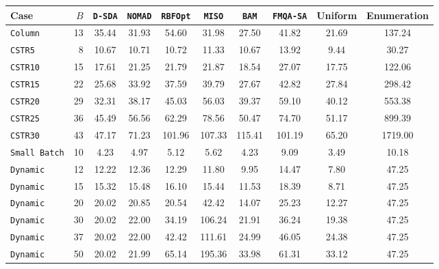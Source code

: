 \begin{tabular}{@{}lrcccccccc@{}}\toprule
Case & \(B\) & \texttt{D-SDA} & \texttt{NOMAD} & \texttt{RBFOpt} & \texttt{MISO} & \texttt{BAM} & \texttt{FMQA-SA} & Uniform & Enumeration \\\midrule
\texttt{Column} & 13 & 35.44 & 31.93 & 54.60 & 31.98 & 27.50 & 41.82 & 21.69 & 137.24 \\
\texttt{CSTR5} & 8 & 10.67 & 10.71 & 10.72 & 11.33 & 10.67 & 13.92 & 9.44 & 30.27 \\
\texttt{CSTR10} & 15 & 17.61 & 21.25 & 21.79 & 21.87 & 18.54 & 27.07 & 17.75 & 122.06 \\
\texttt{CSTR15} & 22 & 25.68 & 33.92 & 37.59 & 39.79 & 27.67 & 42.82 & 27.84 & 298.42 \\
\texttt{CSTR20} & 29 & 32.31 & 38.17 & 45.03 & 56.03 & 39.37 & 59.10 & 40.12 & 553.38 \\
\texttt{CSTR25} & 36 & 45.49 & 56.56 & 62.29 & 78.56 & 50.47 & 74.70 & 51.17 & 899.39 \\
\texttt{CSTR30} & 43 & 47.17 & 71.23 & 101.96 & 107.33 & 115.41 & 101.19 & 65.20 & 1719.00 \\
\texttt{Small Batch} & 10 & 4.23 & 4.97 & 5.12 & 5.62 & 4.23 & 9.09 & 3.49 & 10.18 \\
\texttt{Dynamic} & 12 & 12.22 & 12.36 & 12.29 & 11.80 & 9.95 & 14.47 & 7.80 & 47.25 \\
\texttt{Dynamic} & 15 & 15.32 & 15.48 & 16.10 & 15.44 & 11.53 & 18.39 & 8.71 & 47.25 \\
\texttt{Dynamic} & 20 & 20.02 & 20.85 & 20.54 & 42.42 & 14.07 & 25.23 & 12.27 & 47.25 \\
\texttt{Dynamic} & 30 & 20.02 & 22.00 & 34.19 & 106.24 & 21.91 & 36.24 & 19.38 & 47.25 \\
\texttt{Dynamic} & 37 & 20.02 & 22.00 & 42.42 & 111.61 & 24.99 & 46.05 & 24.38 & 47.25 \\
\texttt{Dynamic} & 50 & 20.02 & 21.99 & 65.14 & 195.36 & 33.98 & 61.31 & 33.12 & 47.25 \\
\bottomrule\end{tabular}
